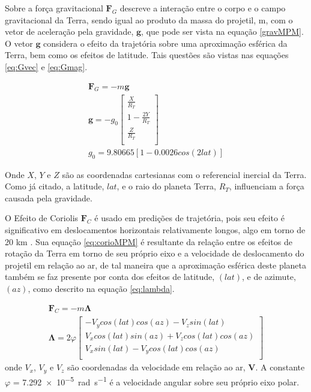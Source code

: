 Sobre a força gravitacional \(\boldsymbol{F}_{G}\) descreve a interação entre o corpo e o campo gravitacional da Terra, sendo igual ao produto da massa do projetil, m, com o vetor de aceleração pela gravidade, \(\boldsymbol{g}\), que pode ser vista na equação \ref{gravMPM}. O vetor \(\boldsymbol{g}\) considera o efeito da trajetória sobre uma aproximação esférica da Terra, bem como os efeitos de latitude. Tais questões são vistas nas equações \ref{eq:Gvec} e \ref{eq:Gmag}.

\begin{gather}
    \label{gravMPM}
    \boldsymbol{F}_{G} = -m\boldsymbol{g} \\
    \label{eq:Gvec}
    \boldsymbol{g} = -g_{0}\begin{bmatrix} 
        \frac{X}{R_{T}} \\
        1 - \frac{2Y}{R_{T}}\\
        \frac{Z}{R_{T}} \\
    \end{bmatrix} \\
    \label{eq:Gmag}
    g_{0} = \num{9,80665}[1 - \num{0,0026}cos(2lat)] 
\end{gather}

Onde \(X\), \(Y\) e \(Z\) são as coordenadas cartesianas com o referencial inercial da Terra. Como já citado, a latitude, \(lat\), e o raio do planeta Terra, \(R_{T}\), influenciam a força causada pela gravidade.

O Efeito de Coriolis \(\boldsymbol{F}_{C}\) é usado em predições de trajetória, pois seu efeito é significativo em deslocamentos horizontais relativamente longos, algo em torno de 20 km \cite{McCoy2012}. Sua equação \ref{eq:corioMPM} é resultante da relação entre os efeitos de rotação da Terra em torno de seu próprio eixo e a velocidade de deslocamento do projetil em relação ao ar, de tal maneira que a aproximação esférica deste planeta também se faz presente por conta dos efeitos de latitude, \(\left(lat\right)\), e de azimute, \(\left(az\right)\), como descrito na equação \ref{eq:lambda}.

\begin{gather}
\label{eq:corioMPM}
\boldsymbol{F}_{C} = -m\boldsymbol{\Lambda} \\
\label{eq:lambda}
\boldsymbol{\Lambda} = 2\varphi
\begin{bmatrix} 
    -V_{y}cos(lat)cos(az) - V_{z}sin(lat) \\
    V_{x}cos(lat)sin(az) + V_{z}cos(lat)cos(az)\\
    V_{x}sin(lat) - V_{y}cos(lat)cos(az) \\
\end{bmatrix}
\end{gather}
%
onde \(V_{x}\), \(V_{y}\) e \(V_{z}\) são coordenadas da velocidade em relação ao ar, \(\boldsymbol{V}\). A constante \(\varphi\) = \qty{7,292e-5}{\radian\per\second} é a velocidade angular sobre seu próprio eixo polar.

